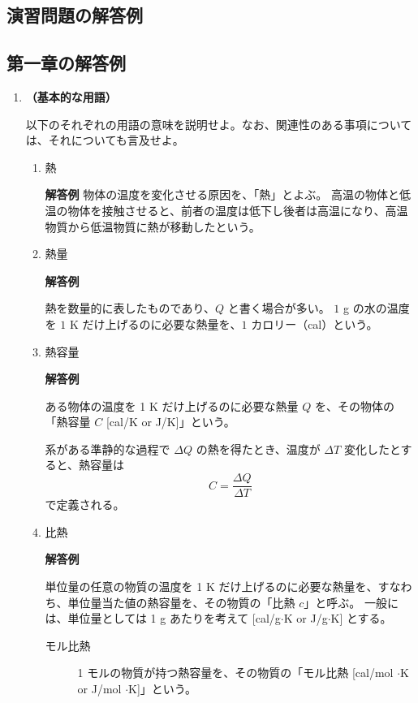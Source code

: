 \documentclass[uplatex,dvipdfmx,a4paper,11pt]{jsarticle}
\begin{document}
\newpage

\begin{appendix}

\section{演習問題の解答例}

\subsection{第一章の解答例}


\begin{enumerate}
\item
{\bf （基本的な用語）}

以下のそれぞれの用語の意味を説明せよ。なお、関連性のある事項については、それについても言及せよ。

\begin{enumerate}
\item
熱

{\bf 解答例}
物体の温度を変化させる原因を、「熱」とよぶ。
高温の物体と低温の物体を接触させると、前者の温度は低下し後者は高温になり、高温物質から低温物質に熱が移動したという。

\item
熱量

{\bf 解答例}

熱を数量的に表したものであり、$Q$ と書く場合が多い。
$1$ g の水の温度を $1$ K だけ上げるのに必要な熱量を、$1$ カロリー（cal）という。

\item
熱容量

{\bf 解答例}

ある物体の温度を 1 K だけ上げるのに必要な熱量 $Q$ を、その物体の「熱容量 $C$ [cal/K or J/K]」という。

系がある準静的な過程で $\Delta Q$ の熱を得たとき、温度が $\Delta T$ 変化したとすると、熱容量は
\[C = \dfrac{\Delta Q}{\Delta T}\]
で定義される。 

\item
比熱

{\bf 解答例}

単位量の任意の物質の温度を 1 K だけ上げるのに必要な熱量を、すなわち、単位量当た値の熱容量を、その物質の「比熱 $c$」と呼ぶ。
一般には、単位量としては 1 g あたりを考えて [cal/g$\cdot$K or J/g$\cdot$K] とする。

\begin{description}
\item[モル比熱]
1 モルの物質が持つ熱容量を、その物質の「モル比熱 [cal/mol $\cdot$K or J/mol $\cdot$K]」という。


\end{description}
\end{enumerate}
\end{enumerate}
\end{appendix}
\end{document}
